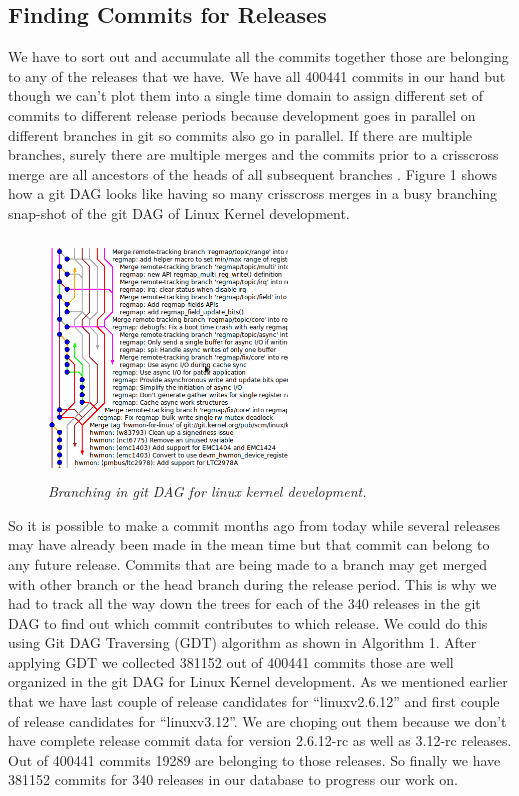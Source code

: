 \documentclass{acm_proc_article-sp}
\begin{document}
\subsection{Finding Commits for Releases}
We have to sort out and accumulate all the commits together those are belonging to any of the releases that we have. We have all 400441 commits in our hand but though we can't plot them into a single time domain to assign different set of commits to different release periods because development goes in parallel on different branches in git so commits also go in parallel. If there are multiple branches, surely there are multiple merges and the commits prior to a crisscross merge are all ancestors of the heads of all subsequent branches \cite{bird_git}. Figure 1 shows how a git DAG looks like having so many crisscross merges in a busy branching snap-shot of the git DAG of Linux Kernel development.
\begin{figure}
\begin{center}
\includegraphics[height=2.5in,width=2.5in]{gitdag.png}
\caption{\small \sl Branching in git DAG for linux kernel development.}
\end{center}
\end{figure}
So it is possible to make a commit months ago from today while several releases may have already been made in the mean time but that commit can belong to any future release. Commits that are being made to a branch may get merged with other branch or the head branch during the release period. This is why we had to track all the way down the trees for each of the 340 releases in the git DAG to find out which commit contributes to which release. We could do this using Git DAG Traversing (GDT) algorithm as shown in Algorithm 1. After applying GDT we collected 381152 out of 400441 commits those are well organized in the git DAG for Linux Kernel development. As we mentioned earlier that we have last couple of release candidates for ``linuxv2.6.12'' and first couple of release candidates for ``linuxv3.12''. We are choping out them because we don't have complete release commit data for version 2.6.12-rc as well as 3.12-rc releases. Out of 400441 commits 19289 are belonging to those releases. So finally we have 381152 commits for 340 releases in our database to progress our work on.
\end{document}
